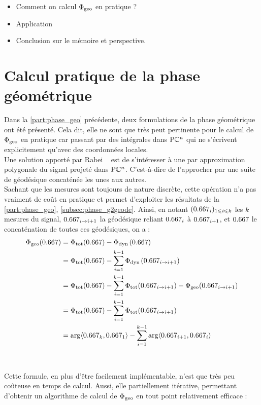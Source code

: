 
\begin{itemize}
	
	\item Comment on calcul $\Phi_{\text{\normalfont geo}}$ en pratique ?
	
	\item Application
	
	\item Conclusion sur le mémoire et perspective.
\end{itemize}




\section{Calcul pratique de la phase géométrique}

Dans la \cref{part:phase_geo} précédente, deux formulations de la phase géométrique ont été présenté. Cela dit, elle ne sont que très peut pertinente pour le calcul de $\Phi_{\text{\normalfont geo}}$ en pratique car passant par des intégrales dans $\text{\normalfont P}\mathbb{C}^{n}$ qui ne s'écrivent explicitement qu'avec des coordonnées locales.
\\

Une solution apporté par Rabei \etal~\cite{rabei_bargmann_1999} est de s'intéresser à une par approximation polygonale du signal projeté dans $\text{\normalfont P}\mathbb{C}^{n}$. 
C'est-à-dire de l'approcher par une suite de géodésique concaténée les unes aux autres. 
\\
Sachant que les mesures sont toujours de nature discrète, cette opération n'a pas vraiment de coût en pratique et permet d'exploiter les résultats de la \cref{part:phase_geo}, \cref{subsec:phase_g2geode}. 
Ainsi, en notant $(\x_i)_{1\leq i\leq k}$ les $k$ mesures du signal, $\x_{i\rightarrow i+1}$ la géodésique reliant $\x_i$ à $\x_{i+1}$, et $\x$ le concaténation de toutes ces géodésiques, on a  :
\begin{align*}
\phaseg(\x) &= \phaset(\x) - \phased(\x) \\
	&= \phaset(\x) - \sum_{i=1}^{k-1} \phased(\x_{i\rightarrow i+1}) \\
	&= \phaset(\x) - \sum_{i=1}^{k-1} \phaset(\x_{i\rightarrow i+1}) - \phaseg(\x_{i\rightarrow i+1}) \\
	&= \phaset(\x) - \sum_{i=1}^{k-1} \phaset(\x_{i\rightarrow i+1}) \\
	&= \arg\langle\x_k, \x_1\rangle - \sum_{i=1}^{k-1} \arg\langle\x_{i+1}, \x_i\rangle
\end{align*} 
\\
\\
Cette formule, en plus d'être facilement implémentable, n'est que très peu coûteuse en temps de calcul. Aussi, elle partiellement itérative, permettant d'obtenir un algorithme de calcul de $\Phi_{\text{\normalfont geo}}$ en tout point relativement efficace :


